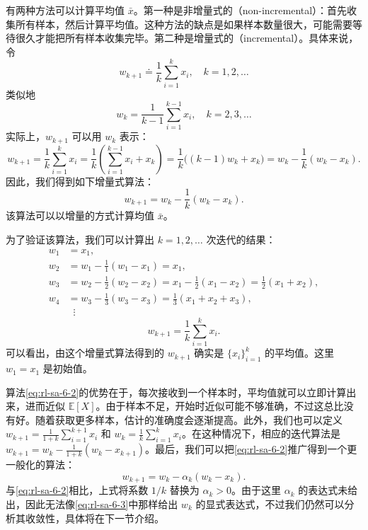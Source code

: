 有两种方法可以计算平均值 $\bar{x}$。第一种是非增量式的（non-incremental）：首先收集所有样本，然后计算平均值。这种方法的缺点是如果样本数量很大，可能需要等待很久才能把所有样本收集完毕。第二种是增量式的（incremental）。具体来说，令
\begin{equation}
w_{k+1} \doteq \frac{1}{k} \sum_{i=1}^{k} x_i, \quad k = 1, 2, \dots
\end{equation}
类似地
\begin{equation}
w_k = \frac{1}{k-1} \sum_{i=1}^{k-1} x_i, \quad k = 2, 3, \dots
\end{equation}
实际上，$w_{k+1}$ 可以用 $w_k$ 表示：
\begin{equation}
w_{k+1} = \frac{1}{k} \sum_{i=1}^{k} x_i = \frac{1}{k} \left( \sum_{i=1}^{k-1} x_i + x_k \right) = \frac{1}{k} \big( (k-1) w_k + x_k \big) = w_k - \frac{1}{k} (w_k - x_k).
\end{equation}
因此，我们得到如下增量式算法：
\begin{equation}
w_{k+1} = w_k - \frac{1}{k} (w_k - x_k).
\label{eq:rl-sa-6-2}
\end{equation}
该算法可以以增量的方式计算均值 $\bar{x}$。

为了验证该算法，我们可以计算出 $k = 1, 2, \ldots$ 次迭代的结果：
\begin{equation}
\begin{aligned}
w_1 &= x_1, \\
w_2 &= w_1 - \frac{1}{1} (w_1 - x_1) = x_1, \\
w_3 &= w_2 - \frac{1}{2} (w_2 - x_2) = x_1 - \frac{1}{2} (x_1 - x_2) = \frac{1}{2} (x_1 + x_2), \\
w_4 &= w_3 - \frac{1}{3} (w_3 - x_3) = \frac{1}{3} (x_1 + x_2 + x_3), \\
&\;\;\vdots
\end{aligned}
\end{equation}
\begin{equation}
w_{k+1} = \frac{1}{k} \sum_{i=1}^{k} x_i.
\label{eq:rl-sa-6-3}
\end{equation}
可以看出，由这个增量式算法得到的 $w_{k+1}$ 确实是 $\{x_i\}_{i=1}^k$ 的平均值。这里 $w_1 = x_1$ 是初始值。

算法\eqref{eq:rl-sa-6-2}的优势在于，每次接收到一个样本时，平均值就可以立即计算出来，进而近似 $\mathbb{E}[X]$。由于样本不足，开始时近似可能不够准确，不过这总比没有好。随着获取更多样本，估计的准确度会逐渐提高。此外，我们也可以定义 $w_{k+1} = \frac{1}{1+k}\sum_{i=1}^{k+1}x_i$ 和 $w_k = \frac{1}{k}\sum_{i=1}^{k}x_i$。在这种情况下，相应的迭代算法是 $w_{k+1} = w_k - \frac{1}{1+k}(w_k - x_{k+1})$。最后，我们可以把\eqref{eq:rl-sa-6-2}推广得到一个更一般化的算法：
\begin{equation}
w_{k+1} = w_k - \alpha_k (w_k - x_k).
\label{eq:rl-sa-6-4}
\end{equation}
与\eqref{eq:rl-sa-6-2}相比，上式将系数 $1/k$ 替换为 $\alpha_k > 0$。由于这里 $\alpha_k$ 的表达式未给出，因此无法像\eqref{eq:rl-sa-6-3}中那样给出 $w_k$ 的显式表达式，不过我们仍然可以分析其收敛性，具体将在下一节介绍。


